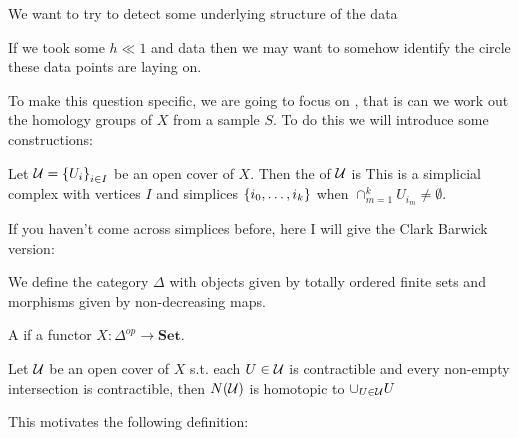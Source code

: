 \documentclass{article}
\begin{document}
We want to try to detect some underlying structure of the data

\begin{example}
	If we took some $h\ll 1$ and data 
then we may want to somehow identify the circle these data points are laying on. 
\end{example}

To make this question specific, we are going to focus on , that is can we work out the homology groups of $X$ from a sample $S$. To do this we will introduce some constructions:

\begin{definition}
	Let $\mathcal{U} = \left\{ U_i \right\}_{i \in I}$ be an open cover of $X$. Then the  of $\mathcal{U}$ is 
This is a simplicial complex with vertices $I$ and simplices $\left\{ i_0, \dots, i_k \right\}$ when $\cap_{m=1}^k U_{i_m} \neq \emptyset$. 
\end{definition}

\begin{aside}
	If you haven't come across simplices before, here I will give the Clark Barwick version:
	
	\begin{definition}
		We define the category $\Delta$ with objects given by totally ordered finite sets
		and morphisms given by non-decreasing maps. 
	\end{definition}
	
	\begin{definition}
		A  if a functor $X:\Delta^{op} \to \bm{Set}$.
	\end{definition}
\end{aside}

\begin{theorem}
	Let $\mathcal{U}$ be an open cover of $X$ s.t. each $U \in \mathcal{U}$ is contractible and every non-empty intersection is contractible, then $N(\mathcal{U})$ is homotopic to $\cup_{U \in \mathcal{U}} U$
\end{theorem}


This motivates the following definition:
\end{document}
